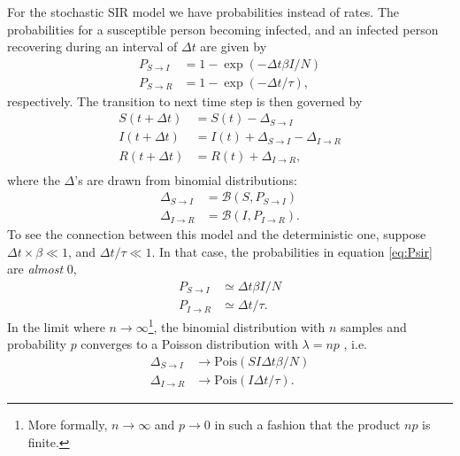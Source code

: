 For the stochastic SIR model we have probabilities instead of rates. The probabilities for a susceptible person becoming infected, and an infected person recovering during an interval of $\Delta t$ are given by
\begin{subequations}\label{eq:Psir}
	\begin{align}
		P_{S\to I} &= 1- \exp{(-\Delta t \beta I /N)} \\
		P_{S\to R} &= 1- \exp{(-\Delta t /\tau)},
	\end{align}
\end{subequations}
respectively. The transition to next time step is then governed by 
\begin{subequations}\label{eq:sir_disc}
	\begin{align}
		S(t + \Delta t) &= S(t) - \Delta_{S\to I} \\
		I(t + \Delta t) &= I(t) + \Delta_{S\to I} - \Delta_{I\to R} \\
		R(t + \Delta t) &= R(t) + \Delta_{I \to R}, \\
	\end{align}
\end{subequations}
where the $\Delta$'s are drawn from binomial distributions:
\begin{subequations}
	\begin{align*}
		\Delta_{S\to I } &= \mathcal{B}(S,P_{S \to I}) \\
		\Delta_{I\to R } &= \mathcal{B}(I,P_{I \to R}).
	\end{align*}
\end{subequations}
To see the connection between this model and the deterministic one, suppose $\Delta t \times \beta \ll 1$, and $\Delta t/\tau \ll 1$. In that case, the probabilities in equation \eqref{eq:Psir} are \textit{almost} 0, 
\begin{subequations}
	\begin{align}
		P_{S\to I} &\simeq \Delta t \beta I/N \\
		P_{I\to R} &\simeq \Delta t/\tau. 
	\end{align}
\end{subequations}
In the limit where $n\to \infty$\footnote{More formally, $n\to \infty$ and $p\to 0$ in such a fashion that the product $np$ is finite. }, the binomial distribution with $n$ samples and probability $p$ converges to a Poisson distribution with $\lambda = np$ \cite{Wassermann}, i.e. 
\begin{subequations}
	\begin{align}
		\Delta_{S\to I} &\to \mathrm{Pois}(SI \Delta t \beta/N) \\
		\Delta_{I\to R} &\to \mathrm{Pois}(I \Delta t/\tau).
	\end{align}
\end{subequations}
